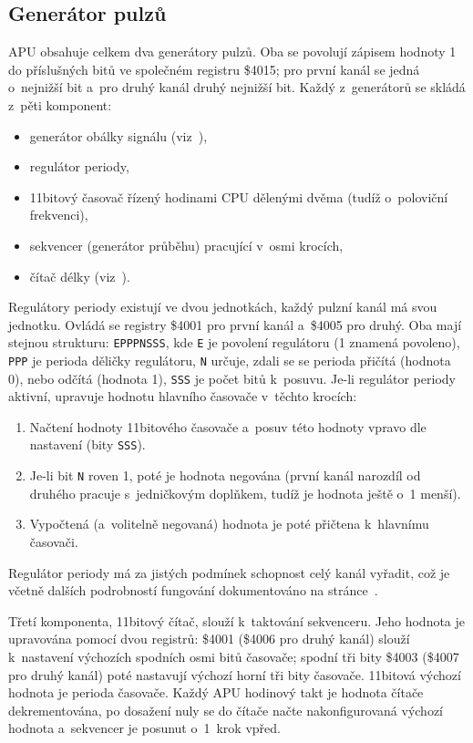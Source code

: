 \subsection{Generátor pulzů}
APU obsahuje celkem dva generátory pulzů. Oba se povolují zápisem hodnoty 1 do příslušných bitů ve společném registru \$4015; pro první kanál se jedná o~nejnižší bit a~pro druhý kanál druhý nejnižší bit. Každý z~generátorů se skládá z~pěti komponent:
\begin{itemize}
	\item generátor obálky signálu (viz~\cite{Nesdev:apu-envelope}),
	\item regulátor periody,
	\item 11bitový časovač řízený hodinami CPU dělenými dvěma (tudíž o~poloviční frekvenci),
	\item sekvencer (generátor průběhu) pracující v~osmi krocích,
	\item čítač délky (viz~\cite{Nesdev:apu-length-counter}).
\end{itemize}

Regulátory periody existují ve dvou jednotkách, každý pulzní kanál má svou jednotku. Ovládá se registry \$4001 pro první kanál a~\$4005 pro druhý. Oba mají stejnou strukturu: \texttt{EPPPNSSS}, kde \texttt{E} je povolení regulátoru (1 znamená povoleno), \texttt{PPP} je perioda děličky regulátoru, \texttt{N} určuje, zdali se se perioda přičítá (hodnota 0), nebo odčítá (hodnota 1), \texttt{SSS} je počet bitů k~posuvu. Je-li regulátor periody aktivní, upravuje hodnotu hlavního časovače v~těchto krocích:
\begin{enumerate}
	\item Načtení hodnoty 11bitového časovače a~posuv této hodnoty vpravo dle nastavení (bity \texttt{SSS}).
	\item Je-li bit \texttt{N} roven 1, poté je hodnota negována (první kanál narozdíl od druhého pracuje s~jedničkovým doplňkem, tudíž je hodnota ještě o~1 menší).
	\item Vypočtená (a~volitelně negovaná) hodnota je poté přičtena k~hlavnímu časovači.
\end{enumerate}

Regulátor periody má za jistých podmínek schopnost celý kanál vyřadit, což je včetně dalších podrobností fungování dokumentováno na stránce~\cite{Nesdev:apu-sweep}.

Třetí komponenta, 11bitový čítač, slouží k~taktování sekvenceru. Jeho hodnota je upravována pomocí dvou registrů: \$4001 (\$4006 pro druhý kanál) slouží k~nastavení výchozích spodních osmi bitů časovače; spodní tři bity \$4003 (\$4007 pro druhý kanál) poté nastavují výchozí horní tři bity časovače. 11bitová výchozí hodnota je perioda časovače. Každý APU hodinový takt je hodnota čítače dekrementována, po dosažení nuly se do čítače načte nakonfigurovaná výchozí hodnota a~sekvencer je posunut o~1~krok vpřed.~\cite{Nesdev:apu-pulse}


